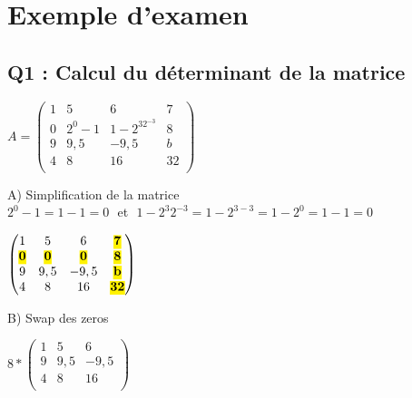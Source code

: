 
\newpage
\chapter{Exemple d'examen}
\section{Q1 : Calcul du déterminant de la matrice}

\vspace{5mm} %

$
A =
\begin{pmatrix}
  1 & 5 & 6 & 7 \\
  0 & 2^0-1 & 1-2^32^{-3} & 8 \\
  9 & 9,5 & -9,5 & b \\
  4 & 8 & 16 & 32 \\
\end{pmatrix}
$

\vspace{10mm} %

A) Simplification de la matrice \\

\vspace{2mm} %
$2^{0}-1 = 1-1 = 0$ $ $ et  $ $ $1-2^{3} 2^{-3} = 1-2^{3-3} = 1-2^{0} = 1-1 = 0$
\vspace{4mm} %

$
\begin{pmatrix}
  1 & 5 & 6 & \hl{\textbf{7}} \\
  \hl{\textbf{0}} & \hl{\textbf{0}} & \hl{\textbf{0}} & \hl{\textbf{8}} \\
  9 & 9,5 & -9,5 & \hl{\textbf{b}} \\
  4 & 8 & 16 & \hl{\textbf{32}} \\
\end{pmatrix}
$

\vspace{10mm} %

B) Swap des zeros\\

\vspace{5mm} %

$
8*
\begin{pmatrix}
  1 & 5 & 6 \\
  9 & 9,5 & {-9,5} \\
  4 & 8 & 16 \\
\end{pmatrix}
$

